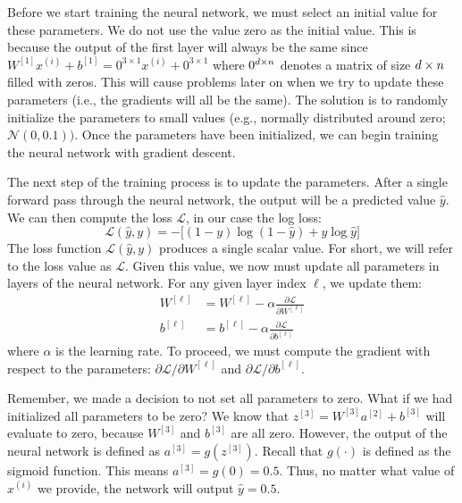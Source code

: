 \documentclass{article}
\numberwithin{equation}{section}
\begin{document}
Before we start training the neural network, we must select an initial value for these parameters.
We do not use the value zero as the initial value.
This is because the output of the first layer will always be the same since $  W^{[1]} x^{(i)} + b^{[1]} = 0^{3 \times 1} x^{(i)} + 0^{3 \times 1}$ where $0^{{d} \times {n}}$ denotes a matrix of size ${d} \times {n}$ filled with zeros.
This will cause problems later on when we try to update these parameters (i.e., the gradients will all be the same).
The solution is to randomly initialize the parameters to small values (e.g., normally distributed around zero; $\mathcal{N}(0, 0.1))$.
Once the parameters have been initialized, we can begin training the neural network with gradient descent.

The next step of the training process is to update the parameters.
After a single forward pass through the neural network, the output will be a predicted value $\hat{y}$.
We can then compute the loss $\mathcal{L}$, in our case the log loss:
\begin{equation}
\mathcal{L}(\hat{y}, y) = -\bigg[(1-y) \log(1 - \hat{y}) + y \log \hat{y}\bigg]
\end{equation}
The loss function $\mathcal{L}(\hat{y}, y)$ produces a single scalar value. For short, we will refer to the loss value as $\mathcal{L}$.
Given this value, we now must update all parameters in layers of the neural network.
For any given layer index $\ell$, we update them:
\begin{align}\label{eq:dW}
W^{[\ell]} &= W^{[\ell]} - \alpha \frac{\partial \mathcal{L}}{\partial W^{[\ell]}} \\ \label{eq:db}
b^{[\ell]} &= b^{[\ell]} - \alpha \frac{\partial \mathcal{L}}{\partial b^{[\ell]}}
\end{align}
where $\alpha$ is the learning rate. To proceed, we must compute the gradient with respect to the parameters: $\partial \mathcal{L}/\partial W^{[\ell]}$ and $\partial \mathcal{L} / \partial b^{[\ell]}$.

Remember, we made a decision to not set all parameters to zero.
What if we had initialized all parameters to be zero?
We know that $z^{[3]} = W^{[3]} a^{[2]} + b^{[3]}$ will evaluate to zero, because $W^{[3]}$ and $b^{[3]}$ are all zero.
However, the output of the neural network is defined as $a^{[3]} = g(z^{[3]})$.
Recall that $g(\cdot)$ is defined as the sigmoid function. This means $a^{[3]}=  g(0)=0.5$.
Thus, no matter what value of $x^{(i)}$ we provide, the network will output $\hat{y} = 0.5$.
\end{document}
